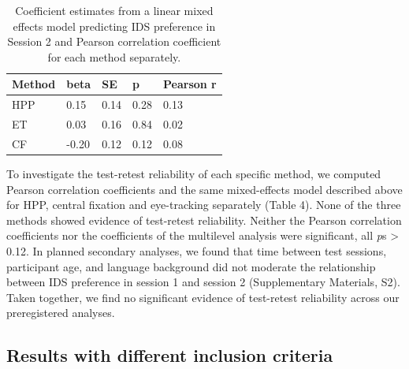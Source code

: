 \documentclass[
  man,floatsintext]{apa6}
\begin{document}
\begin{table}[tbp]

\begin{center}
\begin{threeparttable}

\caption{\label{tab:unnamed-chunk-6}Coefficient estimates from a linear mixed effects model predicting IDS preference in Session 2 and Pearson correlation coefficient for each method separately.}

\begin{tabular}{lllll}
\toprule
Method & beta & SE & p & Pearson r\\
\midrule
HPP & 0.15 & 0.14 & 0.28 & 0.13\\
ET & 0.03 & 0.16 & 0.84 & 0.02\\
CF & -0.20 & 0.12 & 0.12 & 0.08\\
\bottomrule
\end{tabular}

\end{threeparttable}
\end{center}

\end{table}

To investigate the test-retest reliability of each specific method, we computed Pearson correlation coefficients and the same mixed-effects model described above for HPP, central fixation and eye-tracking separately (Table 4).
None of the three methods showed evidence of test-retest reliability.
Neither the Pearson correlation coefficients nor the coefficients of the multilevel analysis were significant, all \emph{p}s \textgreater{} 0.12.
In planned secondary analyses, we found that time between test sessions, participant age, and language background did not moderate the relationship between IDS preference in session 1 and session 2 (Supplementary Materials, S2).
Taken together, we find no significant evidence of test-retest reliability across our preregistered analyses.

\hypertarget{results-with-different-inclusion-criteria}{%
\subsection{Results with different inclusion criteria}\label{results-with-different-inclusion-criteria}}
\end{document}
